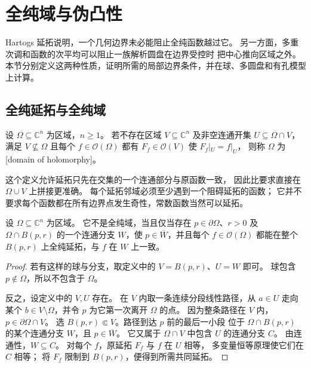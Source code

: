 \section{全纯域与伪凸性}
\label{b3:sec:2904}

Hartogs 延拓说明，一个几何边界未必能阻止全纯函数越过它。
另一方面，多重次调和函数的次平均可以阻止一族解析圆盘在边界受控时
把中心推向区域之外。
本节分别定义这两种性质，证明所需的局部边界条件，并在球、多圆盘和有孔模型上计算。

\subsection{全纯延拓与全纯域}
\label{b3:subsec:290401}

\begin{definition}\label{b3:def:29-domain-holomorphy}
设 \(\Omega\subseteq\mathbb C^n\) 为区域，\(n\ge1\)。
若不存在区域 \(V\subseteq\mathbb C^n\) 及非空连通开集 \(U\subseteq\Omega\cap V\)，
满足 \(V\not\subseteq\Omega\) 且每个 \(f\in\mathcal O(\Omega)\)
都有 \(F_f\in\mathcal O(V)\) 使 \(F_f|_U=f|_U\)，
则称 \(\Omega\) 为[domain of holomorphy]。
\end{definition}

这个定义允许延拓只先在交集的一个连通部分与原函数一致，
因此比要求直接在 \(\Omega\cup V\) 上拼接更准确。
每个延拓邻域必须至少遇到一个阻碍延拓的函数；
它并不要求每个函数都在所有边界点发生奇性，常数函数当然可以延拓。

\begin{proposition}[共同延拓的局部形式]\label{b3:prop:29-local-domain-holomorphy}
设 \(\Omega\subseteq\mathbb C^n\) 为区域。
它不是全纯域，当且仅当存在 \(p\in\partial\Omega\)、\(r>0\)
及 \(\Omega\cap B(p,r)\) 的一个连通分支 \(W\)，使
\(p\in\overline W\)，并且每个 \(f\in\mathcal O(\Omega)\)
都能在整个 \(B(p,r)\) 上全纯延拓，与 \(f\) 在 \(W\) 上一致。
\end{proposition}
\begin{proof}
若有这样的球与分支，取定义中的 \(V=B(p,r)\)、\(U=W\) 即可。
球包含 \(p\notin\Omega\)，所以不包含于 \(\Omega\)。

反之，设定义中的 \(V,U\) 存在。
在 \(V\) 内取一条连续分段线性路径，从 \(a\in U\) 走向某个
\(b\in V\setminus\Omega\)，并令 \(p\) 为它第一次离开 \(\Omega\) 的点。
因为整条路径在 \(V\) 内，\(p\in\partial\Omega\cap V\)。
选 \(B(p,r)\Subset V\)。路径到达 \(p\) 前的最后一小段
位于 \(\Omega\cap B(p,r)\) 的某个连通分支 \(W\)，且 \(p\in\overline W\)。
它又属于 \(\Omega\cap V\) 中包含 \(U\) 的连通分支 \(C\)。
由连通性，\(W\subseteq C\)。
对每个 \(f\)，原延拓 \(F_f\) 与 \(f\) 在 \(U\) 相等，
多变量恒等原理使它们在 \(C\) 相等；
将 \(F_f\) 限制到 \(B(p,r)\)，便得到所需共同延拓。
\end{proof}

